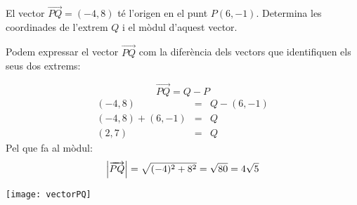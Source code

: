 \Exercise El vector $\overrightarrow{PQ}=(-4,8)$ té l'origen en el punt $P(6,-1)$. Determina les coordinades de l'extrem $Q$ i el mòdul d'aquest vector.

\Answer

Podem expressar el vector $\overrightarrow{PQ}$ com la diferència dels vectors que identifiquen els seus dos extrems:

\begin{minipage}{0.49\linewidth}
  \[\overrightarrow{PQ}=Q-P\]
\begin{eqnarray*}
  (-4,8)&=&Q-(6,-1)\\
  (-4,8)+(6,-1)&=&Q\\
  (2,7)&=&Q
\end{eqnarray*}
Pel que fa al mòdul:
\[\abs{\overrightarrow{PQ}}=\sqrt{(-4)^2+8^2}=\sqrt{80}=4\sqrt{5}\]
\end{minipage}
\hspace{0.01\linewidth}
\begin{minipage}{0.49\linewidth}
\begin{center}
  \texttt{[image: vectorPQ]}
\end{center}
\end{minipage}


\blacksquare 
